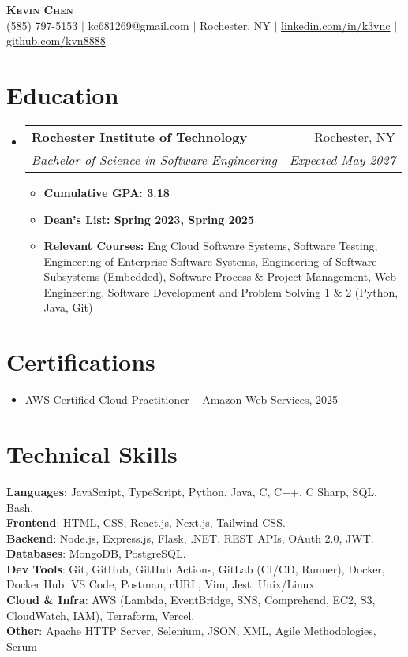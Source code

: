 \documentclass[letterpaper,11pt]{article}
\makeatletter
\newcommand{\resumeItem}[1]{
  \item\small{
    {#1 \vspace{-2pt}}
  }
}
\newcommand{\resumeSubheading}[4]{
  \vspace{-2pt}\item
    \begin{tabular*}{0.97\textwidth}[t]{l@{\extracolsep{\fill}}r}
      \textbf{#1} & #2 \\
      \textit{\small#3} & \textit{\small #4} \\
    \end{tabular*}\vspace{-7pt}
}
\newcommand{\resumeSubHeadingListStart}{\begin{itemize}[leftmargin=0.15in, label={}]}\newcommand{\resumeSubHeadingListEnd}{\end{itemize}}
\newcommand{\resumeItemListStart}{\begin{itemize}}
\newcommand{\resumeItemListEnd}{\end{itemize}\vspace{-5pt}}
\makeatother
\begin{document}
\begin{center}
    \textbf{\Huge \scshape Kevin Chen} \\ \vspace{1pt}
    \small (585) 797-5153 $|$ kc681269@gmail.com $|$ Rochester, NY $|$ 
    \href{https://www.linkedin.com/in/k3vnc/}{linkedin.com/in/k3vnc} $|$ 
    \href{https://github.com/kvn8888}{github.com/kvn8888}
\end{center}

\section{Education}
  \resumeSubHeadingListStart
    \resumeSubheading
      {Rochester Institute of Technology}{Rochester, NY}
      {Bachelor of Science in Software Engineering}{Expected May 2027}
      \resumeItemListStart
        \resumeItem{\textbf{Cumulative GPA: 3.18}}
        \resumeItem{\textbf{Dean's List: Spring 2023, Spring 2025}}
        \resumeItem{\textbf{Relevant Courses:} Eng Cloud Software Systems, Software Testing, Engineering of Enterprise Software Systems, Engineering of Software Subsystems (Embedded), Software Process \& Project Management, Web Engineering, Software Development and Problem Solving 1 \& 2 (Python, Java, Git)}
      \resumeItemListEnd
  \resumeSubHeadingListEnd

\section{Certifications}
  \resumeSubHeadingListStart
    \resumeItem{AWS Certified Cloud Practitioner -- Amazon Web Services, 2025}
  \resumeSubHeadingListEnd

\section{Technical Skills}
\begin{itemize}[leftmargin=0.15in, label={}]
\small{\item{
\textbf{Languages}{: JavaScript, TypeScript, Python, Java, C, C++, C Sharp, SQL, Bash.} \\
\textbf{Frontend}{: HTML, CSS, React.js, Next.js, Tailwind CSS.} \\
\textbf{Backend}{: Node.js, Express.js, Flask, .NET, REST APIs, OAuth 2.0, JWT.} \\
\textbf{Databases}{: MongoDB, PostgreSQL.} \\
\textbf{Dev Tools}{: Git, GitHub, GitHub Actions, GitLab (CI/CD, Runner), Docker, Docker Hub, VS Code, Postman, cURL, Vim, Jest, Unix/Linux.} \\
\textbf{Cloud \& Infra}{: AWS (Lambda, EventBridge, SNS, Comprehend, EC2, S3, CloudWatch, IAM), Terraform, Vercel.} \\
\textbf{Other}{: Apache HTTP Server, Selenium, JSON, XML, Agile Methodologies, Scrum}}}
\end{itemize}
\end{document}
